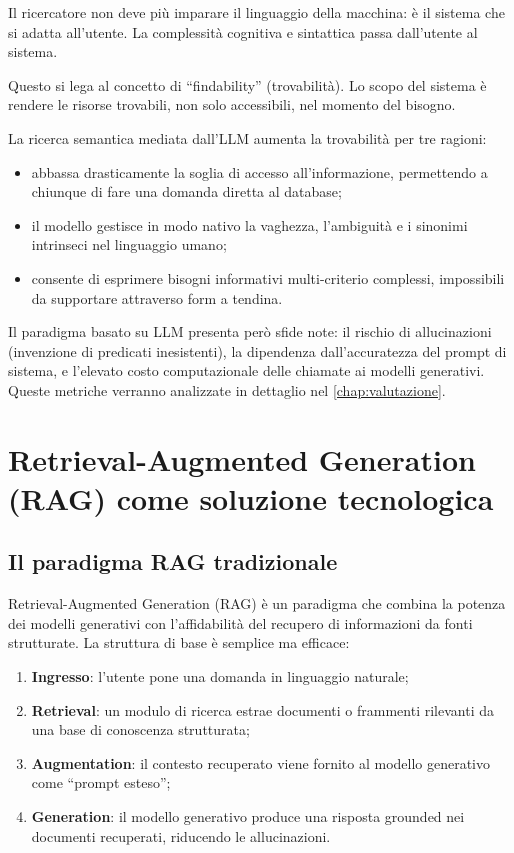     Il ricercatore non deve più imparare il linguaggio della macchina: è il sistema che si adatta all'utente. La complessità cognitiva e sintattica passa dall'utente al sistema.

    Questo si lega al concetto di ``findability'' (trovabilità)\cite{Ros07}. Lo scopo del sistema è rendere le risorse trovabili, non solo accessibili, nel momento del bisogno.

    La ricerca semantica mediata dall'LLM aumenta la trovabilità per tre ragioni:

    \begin{itemize}
        \item abbassa drasticamente la soglia di accesso all'informazione, permettendo a chiunque di fare una domanda diretta al database;
        \item il modello gestisce in modo nativo la vaghezza, l'ambiguità e i sinonimi intrinseci nel linguaggio umano;
        \item consente di esprimere bisogni informativi multi-criterio complessi, impossibili da supportare attraverso form a tendina.
    \end{itemize}

    Il paradigma basato su LLM presenta però sfide note: il rischio di allucinazioni (invenzione di predicati inesistenti), la dipendenza dall'accuratezza del prompt di sistema, e l'elevato costo computazionale delle chiamate ai modelli generativi. Queste metriche verranno analizzate in dettaglio nel \cref{chap:valutazione}.


\section{Retrieval-Augmented Generation (RAG) come soluzione tecnologica}\label{sec:rag}
    \subsection{Il paradigma RAG tradizionale}\label{subsec:rag_trad}

    Retrieval-Augmented Generation (RAG) è un paradigma che combina la potenza dei modelli generativi con l'affidabilità del recupero di informazioni da fonti strutturate. La struttura di base è semplice ma efficace:

    \begin{enumerate}
        \item \textbf{Ingresso}: l'utente pone una domanda in linguaggio naturale;
        \item \textbf{Retrieval}: un modulo di ricerca estrae documenti o frammenti rilevanti da una base di conoscenza strutturata;
        \item \textbf{Augmentation}: il contesto recuperato viene fornito al modello generativo come ``prompt esteso'';
        \item \textbf{Generation}: il modello generativo produce una risposta grounded nei documenti recuperati, riducendo le allucinazioni.
    \end{enumerate}

